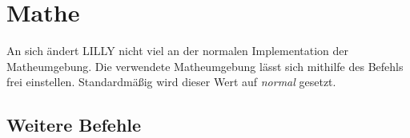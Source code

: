 \chapter[Mathe \LILLYxBOXxVersion{\small 1.0.0}]{Mathe}
\renewcommand{\arraystretch}{1.5}
\reversemarginpar
An sich ändert LILLY nicht viel an der normalen Implementation der Matheumgebung. Die verwendete Matheumgebung lässt sich mithilfe des Befehls  frei einstellen. Standardmäßig wird dieser Wert auf \emph{normal} gesetzt.

\section{Weitere Befehle}


